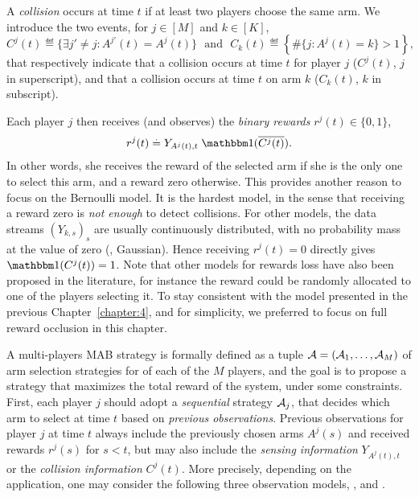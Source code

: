 \begin{definition}
\begin{leftbar}[defnbar]  %
  A \emph{collision} occurs at time $t$ if at least two players choose the same arm.
  We introduce the two events, for $j\in[M]$ and $k\in[K]$,
  \begin{equation}
    C^j(t) \eqdef  \{ \exists j' \neq j : A^{j'}(t) = A^j(t) \}
    \ \ \ \text{and} \ \ \ C_k(t) \eqdef  \left\{ \# \{ j : A^j(t) = k\} > 1 \right\},
  \end{equation}
  that respectively indicate that a collision occurs at time $t$ for player $j$ ($C^j(t)$, $j$ in superscript), and that a collision occurs at time $t$ on arm $k$ ($C_k(t)$, $k$ in subscript).
\end{leftbar}  %
\end{definition}

Each player $j$ then receives (and observes) the \emph{binary rewards}
$r^j(t) \in \{0,1\}$,
\begin{equation}
  r^j(t) \eqdef Y_{A^j(t),t} \; \indic(\overline{C^j(t)}).
\end{equation}
In other words, she receives the reward of the selected arm if she is the only one to select this arm, and a reward zero otherwise.
This provides another reason to focus on the Bernoulli model. It is the hardest model, in the sense that receiving a reward zero is \emph{not enough} to detect collisions. For other models, the data streams $(Y_{k,s})_s$ are usually continuously distributed, with no probability mass at the value of zero (\eg, Gaussian).
Hence receiving $r^j(t) = 0$ directly gives $\indic(C^j(t)) = 1$.
%
Note that other models for rewards loss have also been proposed in the literature, for instance the reward could be randomly allocated to one of the players selecting it.
To stay consistent with the model presented in the previous Chapter~\ref{chapter:4},
and for simplicity, we preferred to focus on full reward occlusion in this chapter.


A multi-players MAB strategy is formally defined as a tuple $\mathcal{A} = (\mathcal{A}_1,\dots,\mathcal{A}_M)$ of arm selection strategies for of each of the $M$ players, and the goal is to propose a strategy that maximizes the total reward of the system, under some constraints.
First, each player $j$ should adopt a \emph{sequential} strategy $\mathcal{A}_j$, that decides which arm to select at time $t$ based on \emph{previous observations}.
Previous observations for player $j$ at time $t$ always include the previously chosen arms $A^j(s)$ and received rewards $r^j(s)$ for $s<t$, but may also include the \emph{sensing information} $Y_{A^j(t),t}$ or the \emph{collision information} $C^j(t)$.
More precisely, depending on the application, one may consider the following three observation models, \modelun, \modeldeux{} and \modeltrois.

